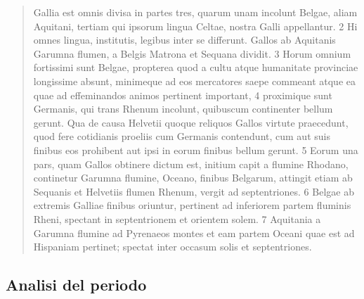 \documentclass[10pt,a4paper]{article}
\begin{document}
	\begin{quote}
		Gallia est omnis divisa in partes tres, quarum unam incolunt Belgae, aliam Aquitani, tertiam qui ipsorum lingua Celtae, nostra Galli appellantur. 2 Hi omnes lingua, institutis, legibus inter se differunt. Gallos ab Aquitanis Garumna flumen, a Belgis Matrona et Sequana dividit. 3 Horum omnium fortissimi sunt Belgae, propterea quod a cultu atque humanitate provinciae longissime absunt, minimeque ad eos mercatores saepe commeant atque ea quae ad effeminandos animos pertinent important, 4 proximique sunt Germanis, qui trans Rhenum incolunt, quibuscum continenter bellum gerunt. Qua de causa Helvetii quoque reliquos Gallos virtute praecedunt, quod fere cotidianis proeliis cum Germanis contendunt, cum aut suis finibus eos prohibent aut ipsi in eorum finibus bellum gerunt. 5 Eorum una pars, quam Gallos obtinere dictum est, initium capit a flumine Rhodano, continetur Garumna flumine, Oceano, finibus Belgarum, attingit etiam ab Sequanis et Helvetiis flumen Rhenum, vergit ad septentriones. 6 Belgae ab extremis Galliae finibus oriuntur, pertinent ad inferiorem partem fluminis Rheni, spectant in septentrionem et orientem solem. 7 Aquitania a Garumna flumine ad Pyrenaeos montes et eam partem Oceani quae est ad Hispaniam pertinet; spectat inter occasum solis et septentriones.
	\end{quote}

	\subsection{Analisi del periodo}
\end{document}
